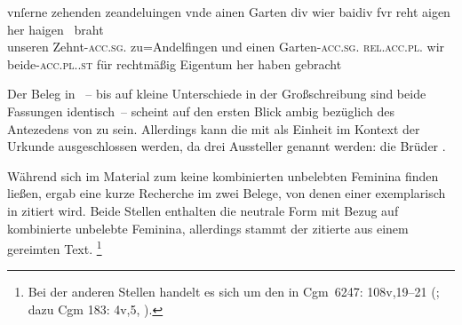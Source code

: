 \begin{exe}
\ex \label{ex:cao_samegend_inan_mm_beidiu}
		\gll vnſerne zehenden zeandeluingen vnde ainen Garten \textelp{} div
				wier baidiv fvr reht aigen her haigen~ braht \\
			unseren Zehnt-\textsc{acc.sg}.\MascI{} zu=Andelfingen und einen
				Garten-\textsc{acc.sg.\MascI} {} \textsc{rel.acc.pl.\NeutI} wir
				beide-\textsc{acc.pl.\NeutI.st} für rechtmäßig Eigentum her
				haben gebracht \\
		\trans {}
			\parencites(Nrn.~1201~AB, Kl.~Heiligkreuztal, Kr.~Biberach,
				1290)[472,10--18]{cao2}

\end{exe}

Der Beleg in ~-- bis auf kleine
Unterschiede in der Großschreibung sind beide Fassungen identisch~-- scheint
auf den ersten Blick ambig bezüglich des Antezedens von
 zu sein. Allerdings kann die  mit 
 als Einheit im Kontext der Urkunde ausgeschlossen werden, da
drei Aussteller genannt werden: die Brüder  \autocites(Nrn.~1201~AB)[472,7]{cao2}.

Während sich im Material zum \CAO{} keine kombinierten unbelebten Feminina
finden ließen, ergab eine kurze Recherche im \REM{} zwei Belege, von denen
einer exemplarisch in  zitiert wird. Beide Stellen
enthalten die neutrale Form  mit Bezug auf kombinierte unbelebte
Feminina, allerdings stammt der zitierte aus einem gereimten Text.%
%
	\footnote{Bei der anderen Stellen handelt es sich um den
		 in
		Cgm~6247: 108v,19--21 (\cite[vgl.][M401]{rem}; dazu
		Cgm 183: 4v,5, \cite[vgl.][M405Y]{rem}).}


